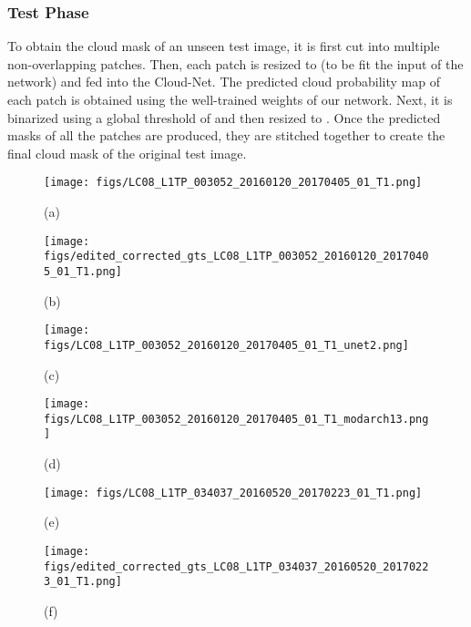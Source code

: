 \documentclass{article}
\begin{document}
\subsubsection{Test Phase}
To obtain the cloud mask of an unseen test image, it is first cut into multiple  non-overlapping patches. Then, each patch is resized to  (to be fit the input of the network) and fed into the Cloud-Net. The predicted cloud probability map of each patch is obtained using the well-trained weights of our network. Next, it is binarized using a global threshold of  and then resized to . Once the predicted masks of all the patches are produced, they are stitched together to create the final cloud mask of the original test image.

\begin{figure}[htb]
\centering
\begin{minipage}{0.2\textwidth}
\centering
\centerline{\texttt{[image: figs/LC08\_L1TP\_003052\_20160120\_20170405\_01\_T1.png]}}\footnotesize{(a)}
\end{minipage}
\vspace{1mm}
\hspace{5mm}
\begin{minipage}{0.2\textwidth}
\centering
\centerline{\texttt{[image: figs/edited\_corrected\_gts\_LC08\_L1TP\_003052\_20160120\_20170405\_01\_T1.png]}}\footnotesize{(b)}
\end{minipage}
\begin{minipage}{0.2\textwidth}
\centering
\centerline{\texttt{[image: figs/LC08\_L1TP\_003052\_20160120\_20170405\_01\_T1\_unet2.png]}}
\footnotesize{(c)}
\end{minipage}
\vspace{1mm}
\hspace{5mm}
\begin{minipage}{0.2\textwidth}
\centering
\centerline{\texttt{[image: figs/LC08\_L1TP\_003052\_20160120\_20170405\_01\_T1\_modarch13.png]}}
\footnotesize{(d)}
\end{minipage}
\begin{minipage}{0.2\textwidth}
\centering
\centerline{\texttt{[image: figs/LC08\_L1TP\_034037\_20160520\_20170223\_01\_T1.png]}}\footnotesize{(e)}
\end{minipage}
\vspace{1mm}
\hspace{5mm}
\begin{minipage}{0.2\textwidth}
\centering
\centerline{\texttt{[image: figs/edited\_corrected\_gts\_LC08\_L1TP\_034037\_20160520\_20170223\_01\_T1.png]}}\footnotesize{(f)}

\end{minipage}
\end{figure}
\end{document}
